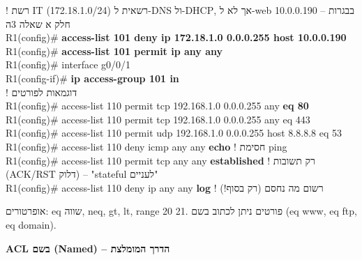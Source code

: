 \documentclass[11pt]{article}
\newcommand{\enLR}[1]{\textenglish{#1}}
\newcommand{\code}[1]{\textenglish{\codefont #1}}
\newcommand{\subheading}[1]{\vskip6pt{\bfseries\color{h3}#1\par}\vskip2pt}
\begin{document}
\begin{codebox}\begin{english}\codefont\footnotesize\color{cfg}\setlength{\parindent}{0pt}
\textcolor{ccom}{\texthebrew{! רשת \enLR{IT (172.18.1.0/24)} רשאית ל-\enLR{DNS} ול-\enLR{DHCP}, אך לא ל-\enLR{web 10.0.0.190} – בבגרות חלק א שאלה \enLR{3}ה}}\\
R1(config)\# \textcolor{cbold}{\textbf{access-list 101 deny ip 172.18.1.0 0.0.0.255 host 10.0.0.190}}\\
R1(config)\# \textcolor{cbold}{\textbf{access-list 101 permit ip any any}}\\
R1(config)\# interface g0/0/1\\
R1(config-if)\# \textcolor{cbold}{\textbf{ip access-group 101 in}}\\
\textcolor{ccom}{\texthebrew{! דוגמאות לפורטים}}\\
R1(config)\# access-list 110 permit tcp 192.168.1.0 0.0.0.255 any \textcolor{cbold}{\textbf{eq 80}}\\
R1(config)\# access-list 110 permit tcp 192.168.1.0 0.0.0.255 any eq 443\\
R1(config)\# access-list 110 permit udp 192.168.1.0 0.0.0.255 host 8.8.8.8 eq 53\\
R1(config)\# access-list 110 deny icmp any any \textcolor{cbold}{\textbf{echo}}            \textcolor{ccom}{\texthebrew{! חסימת \enLR{ping}}}\\
R1(config)\# access-list 110 permit tcp any any \textcolor{cbold}{\textbf{established}}      \textcolor{ccom}{\texthebrew{! רק תשובות \enLR{(ACK/RST} דלוק) – "\enLR{stateful} לעניים"}}\\
R1(config)\# access-list 110 deny ip any any \textcolor{cbold}{\textbf{log}}                 \textcolor{ccom}{\texthebrew{! רשום מה נחסם (רק בסוף!)}}
\end{english}\end{codebox}

אופרטורים: \code{eq} שווה, \code{neq}, \code{gt}, \code{lt}, \code{range 20 21}. פורטים ניתן לכתוב בשם (\code{eq www}, \code{eq ftp}, \code{eq domain}).\par

\subheading{\enLR{ACL} בשם \enLR{(Named)} – הדרך המומלצת}
\end{document}
